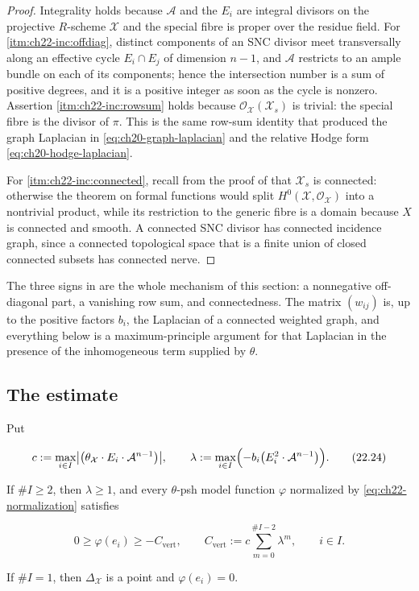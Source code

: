 \begin{proof}
Integrality holds because $\mathcal A$ and the $E_i$ are integral
divisors on the projective $R$-scheme $\mathcal X$ and the special fibre
is proper over the residue field.  For
\cref{itm:ch22-inc:offdiag}, distinct components of an SNC divisor meet
transversally along an effective cycle $E_i\cap E_j$ of dimension
$n-1$, and $\mathcal A$ restricts to an ample bundle on each of its
components; hence the intersection number is a sum of positive degrees, and
it is a positive integer as soon as the cycle is nonzero.  Assertion
\cref{itm:ch22-inc:rowsum} holds because
$\mathcal O_{\mathcal X}(\mathcal X_s)$ is trivial: the special fibre is
the divisor of $\pi$.  This is the same row-sum identity that produced the
graph Laplacian in \eqref{eq:ch20-graph-laplacian} and the relative Hodge
form \eqref{eq:ch20-hodge-laplacian}.

For \cref{itm:ch22-inc:connected}, recall from the proof of
 that $\mathcal X_s$ is connected: otherwise the
theorem on formal functions would split
$H^0(\mathcal X,\mathcal O_{\mathcal X})$ into a nontrivial product, while
its restriction to the generic fibre is a domain because $X$ is connected
and smooth.  A connected SNC divisor has connected incidence graph, since a
connected topological space that is a finite union of closed connected
subsets has connected nerve.
\end{proof}

The three signs in  are the whole mechanism of
this section: a nonnegative off-diagonal part, a vanishing row sum, and
connectedness.  The matrix $(w_{ij})$ is, up to the positive factors
$b_i$, the Laplacian of a connected weighted graph, and everything below is
a maximum-principle argument for that Laplacian in the presence of the
inhomogeneous term supplied by $\theta$.

\subsection{The estimate}

\begin{proposition}
\label{prop:ch22-vertex-estimate}
Put

\[
 c:=\max_{i\in I}\bigl|\bigl(\theta_{\mathcal X}\cdot E_i\cdot
       \mathcal A^{n-1}\bigr)\bigr|,
 \qquad
 \lambda:=\max_{i\in I}\Bigl(-b_i\bigl(E_i^2\cdot
       \mathcal A^{n-1}\bigr)\Bigr).
\tag{22.24}\label{eq:ch22-lambda}
\]

If $\#I\geq2$, then $\lambda\geq1$, and every $\theta$-psh model
function $\varphi$ normalized by \eqref{eq:ch22-normalization} satisfies

\[
 0\geq\varphi(e_i)\geq-C_{\mathrm{vert}},
 \qquad
 C_{\mathrm{vert}}:=c\sum_{m=0}^{\#I-2}\lambda^m,
 \qquad i\in I .
\tag{22.25}\label{eq:ch22-vertex-lower-bound}
\]

If $\#I=1$, then $\Delta_{\mathcal X}$ is a point and
$\varphi(e_i)=0$.
\end{proposition}

